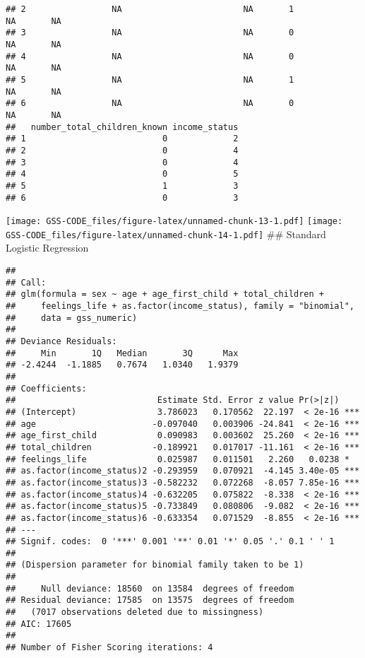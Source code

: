 \documentclass[
]{article}
\begin{document}
\begin{verbatim}
## 2                 NA                        NA       1            NA       NA
## 3                 NA                        NA       0            NA       NA
## 4                 NA                        NA       0            NA       NA
## 5                 NA                        NA       1            NA       NA
## 6                 NA                        NA       0            NA       NA
##   number_total_children_known income_status
## 1                           0             2
## 2                           0             4
## 3                           0             4
## 4                           0             5
## 5                           1             3
## 6                           0             3
\end{verbatim}

\texttt{[image: GSS-CODE\_files/figure-latex/unnamed-chunk-13-1.pdf]}
\texttt{[image: GSS-CODE\_files/figure-latex/unnamed-chunk-14-1.pdf]}
\#\# Standard Logistic Regression

\begin{verbatim}
## 
## Call:
## glm(formula = sex ~ age + age_first_child + total_children + 
##     feelings_life + as.factor(income_status), family = "binomial", 
##     data = gss_numeric)
## 
## Deviance Residuals: 
##     Min       1Q   Median       3Q      Max  
## -2.4244  -1.1885   0.7674   1.0340   1.9379  
## 
## Coefficients:
##                            Estimate Std. Error z value Pr(>|z|)    
## (Intercept)                3.786023   0.170562  22.197  < 2e-16 ***
## age                       -0.097040   0.003906 -24.841  < 2e-16 ***
## age_first_child            0.090983   0.003602  25.260  < 2e-16 ***
## total_children            -0.189921   0.017017 -11.161  < 2e-16 ***
## feelings_life              0.025987   0.011501   2.260   0.0238 *  
## as.factor(income_status)2 -0.293959   0.070921  -4.145 3.40e-05 ***
## as.factor(income_status)3 -0.582232   0.072268  -8.057 7.85e-16 ***
## as.factor(income_status)4 -0.632205   0.075822  -8.338  < 2e-16 ***
## as.factor(income_status)5 -0.733849   0.080806  -9.082  < 2e-16 ***
## as.factor(income_status)6 -0.633354   0.071529  -8.855  < 2e-16 ***
## ---
## Signif. codes:  0 '***' 0.001 '**' 0.01 '*' 0.05 '.' 0.1 ' ' 1
## 
## (Dispersion parameter for binomial family taken to be 1)
## 
##     Null deviance: 18560  on 13584  degrees of freedom
## Residual deviance: 17585  on 13575  degrees of freedom
##   (7017 observations deleted due to missingness)
## AIC: 17605
## 
## Number of Fisher Scoring iterations: 4
\end{verbatim}
\end{document}
